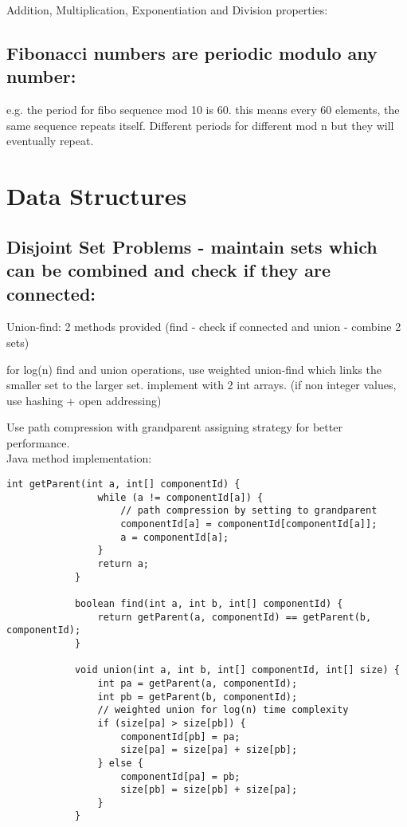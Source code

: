 \documentclass[12pt]{article}
\begin{document}
Addition, Multiplication, Exponentiation and Division properties: 

\subsection{Fibonacci numbers are periodic modulo any number:}
e.g. the period for fibo sequence mod 10 is 60. this means every 60 elements, the same sequence repeats itself. 
Different periods for different mod n but they will eventually repeat. 

\section{Data Structures}

\subsection{Disjoint Set Problems - maintain sets which can be combined and check if they are connected:} 
Union-find: 2 methods provided (find - check if connected and union - combine 2 sets)

for log(n) find and union operations, use weighted union-find which links the smaller set to the larger set. 
implement with 2 int arrays. (if non integer values, use hashing + open addressing) 

Use path compression with grandparent assigning strategy for better performance. \\ [\baselineskip] 

\noindent Java method implementation: 
\begin{verbatim}
int getParent(int a, int[] componentId) {
                while (a != componentId[a]) {
                    // path compression by setting to grandparent
                    componentId[a] = componentId[componentId[a]];
                    a = componentId[a];
                }
                return a;
            }

            boolean find(int a, int b, int[] componentId) {
                return getParent(a, componentId) == getParent(b, componentId);
            }

            void union(int a, int b, int[] componentId, int[] size) {
                int pa = getParent(a, componentId);
                int pb = getParent(b, componentId);
                // weighted union for log(n) time complexity 
                if (size[pa] > size[pb]) {
                    componentId[pb] = pa;
                    size[pa] = size[pa] + size[pb];
                } else {
                    componentId[pa] = pb;
                    size[pb] = size[pb] + size[pa];
                }
            } 
\end{verbatim}
\end{document}
